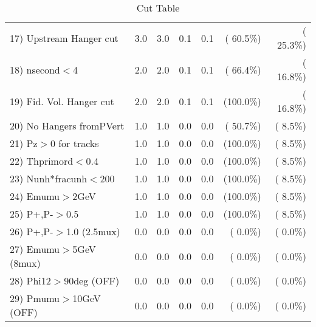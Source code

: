 \begin{table}[h!]
\begin{tabular}{||l||r|r|r|r|r|r||}
 17) Upstream Hanger cut  &          3.0 &          3.0 &          0.1 &          0.1 & ( 60.5\%) & ( 25.3\%) \\
 18) nsecond$<$4          &          2.0 &          2.0 &          0.1 &          0.1 & ( 66.4\%) & ( 16.8\%) \\
 19) Fid. Vol. Hanger cut &          2.0 &          2.0 &          0.1 &          0.1 & (100.0\%) & ( 16.8\%) \\
 20) No Hangers fromPVert &          1.0 &          1.0 &          0.0 &          0.0 & ( 50.7\%) & (  8.5\%) \\
 21) Pz$>$0 for tracks    &          1.0 &          1.0 &          0.0 &          0.0 & (100.0\%) & (  8.5\%) \\
 22) Thprimord$<$0.4      &          1.0 &          1.0 &          0.0 &          0.0 & (100.0\%) & (  8.5\%) \\
 23) Nunh*fracunh$<$200   &          1.0 &          1.0 &          0.0 &          0.0 & (100.0\%) & (  8.5\%) \\
 24) Emumu$>$2GeV         &          1.0 &          1.0 &          0.0 &          0.0 & (100.0\%) & (  8.5\%) \\
 25) P+,P-$>$0.5          &          1.0 &          1.0 &          0.0 &          0.0 & (100.0\%) & (  8.5\%) \\
 26) P+,P-$>$1.0 (2.5mux) &          0.0 &          0.0 &          0.0 &          0.0 & (  0.0\%) & (  0.0\%) \\
 27) Emumu$>$5GeV  (8mux) &          0.0 &          0.0 &          0.0 &          0.0 & (  0.0\%) & (  0.0\%) \\
 28) Phi12$>$90deg  (OFF) &          0.0 &          0.0 &          0.0 &          0.0 & (  0.0\%) & (  0.0\%) \\
 29) Pmumu$>$10GeV  (OFF) &          0.0 &          0.0 &          0.0 &          0.0 & (  0.0\%) & (  0.0\%) \\
 \hline
 \hline
 \end{tabular}
 \caption{Cut Table           }
 \label{tab-cutcohjpsi-mumu_cohrho0}
 \end{table}
